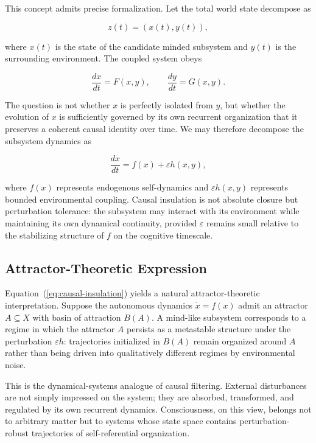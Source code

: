 \documentclass[12pt,a4paper]{article}
\theoremstyle{plain}
\theoremstyle{definition}
\begin{document}
This concept admits precise formalization. Let the total world state decompose as

\begin{equation}
z(t) = (x(t), y(t)),
\end{equation}

where $x(t)$ is the state of the candidate minded subsystem and $y(t)$ is the surrounding environment. The coupled system obeys

\begin{equation}
\frac{dx}{dt} = F(x,y), \qquad \frac{dy}{dt} = G(x,y).
\end{equation}

The question is not whether $x$ is perfectly isolated from $y$, but whether the evolution of $x$ is sufficiently governed by its own recurrent organization that it preserves a coherent causal identity over time. We may therefore decompose the subsystem dynamics as

\begin{equation}
\label{eq:causal-insulation}
\frac{dx}{dt} = f(x) + \varepsilon h(x,y),
\end{equation}

where $f(x)$ represents endogenous self-dynamics and $\varepsilon h(x,y)$ represents bounded environmental coupling. Causal insulation is not absolute closure but perturbation tolerance: the subsystem may interact with its environment while maintaining its own dynamical continuity, provided $\varepsilon$ remains small relative to the stabilizing structure of $f$ on the cognitive timescale.

\subsection{Attractor-Theoretic Expression}

Equation~(\ref{eq:causal-insulation}) yields a natural attractor-theoretic interpretation. Suppose the autonomous dynamics $\dot{x} = f(x)$ admit an attractor $A \subseteq X$ with basin of attraction $B(A)$. A mind-like subsystem corresponds to a regime in which the attractor $A$ persists as a metastable structure under the perturbation $\varepsilon h$: trajectories initialized in $B(A)$ remain organized around $A$ rather than being driven into qualitatively different regimes by environmental noise.

This is the dynamical-systems analogue of causal filtering. External disturbances are not simply impressed on the system; they are absorbed, transformed, and regulated by its own recurrent dynamics. Consciousness, on this view, belongs not to arbitrary matter but to systems whose state space contains perturbation-robust trajectories of self-referential organization.
\end{document}
